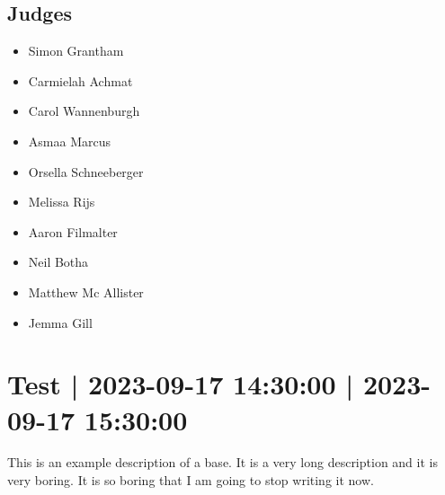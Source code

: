 \documentclass[10pt]{article}
\begin{document}
	\subsection*{Judges}
	\begin{itemize}

			\item Simon Grantham
			\item Carmielah Achmat
			\item Carol Wannenburgh
			\item Asmaa Marcus
			\item Orsella Schneeberger
			\item Melissa Rijs
			\item Aaron Filmalter
			\item Neil Botha
			\item Matthew Mc Allister
			\item Jemma Gill
		\end{itemize}

			\setcounter{section}{49}
	\section{Test | 2023-09-17 14:30:00 | 2023-09-17 15:30:00}
	This is an example description of a base. It is a very long description and it is very boring. It is so boring that I am going to stop writing it now.
\end{document}

